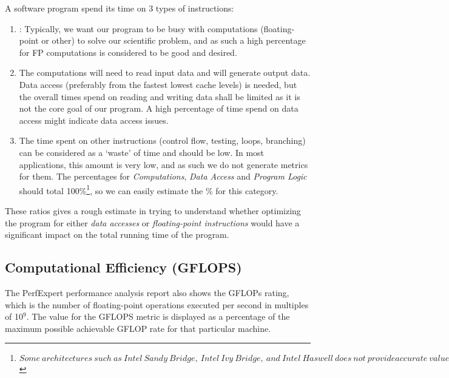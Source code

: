 A software program spend its time on 3 types of instructions:

\begin{enumerate}
  \item  {}: Typically, we want our program to be busy with computations (floating-point or other) to solve our scientific problem, and as such a high percentage for FP computations is considered to be good and desired.
  \item  {} The computations will need to read input data and will generate output data. Data access (preferably from the fastest lowest cache levels) is needed, but the overall times spend on reading and writing data shall be limited as it is not the core goal of our program. A high percentage of time spend on data access might indicate data access issues.
  \item  {} The time spent on other instructions (control flow, testing, loops, branching) can be considered as a `waste' of time and should be low. In most applications, this amount is very low, and as such we do not generate metrics for them. The percentages for \emph{Computations}, \emph{Data Access }and \emph{Program Logic} 
  should total 100\%\footnote{ $ Some\ architectures\ such\ as\ Intel\ Sandy\ Bridge,\ Intel\ Ivy\ Bridge,\ and\ Intel\ Haswell\ does\ not\ provide accurate\ values\ in\ their\ performance\ counter\ events,\ specially\ for\ the\ floating-point\ instructions.\ For\ that\ reason,\ it\ is\ possible\ to\ see\ application\ with\ more\ than\ 100\%\ of\ floating-point\ instruction,\ with\ is\ obviously\ not\ possible.$ }, so we can easily estimate the \% for this category.
\end{enumerate}

These ratios gives a rough estimate in trying to understand whether optimizing the program for either \emph{data accesses} or \emph{floating-point instructions} would have a significant impact on the total running time of the program.

\subsection{Computational Efficiency (GFLOPS)}
\label{subsec:Computational_Efficiancy}

The PerfExpert performance analysis report also shows the GFLOPs rating, which is the number of floating-point operations executed per second in multiples of 10${}^{9}$. The value for the GFLOPS metric is displayed as a percentage of the maximum possible achievable GFLOP rate for that particular machine.

